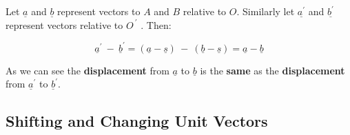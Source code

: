 \begin{note}
\begin{mycenter}
\begin{tikzpicture}[x=0.75pt,y=0.75pt,yscale=-1,xscale=1]
		\end{tikzpicture}
	\end{mycenter}
	Let $\underline{a}$ and $\underline{b}$ represent  vectors  to $A$ and $B$ relative to $O$. Similarly let $\underline{a^{'}}$ and $\underline{b^{'}}$ represent vectors relative to $O^{\ '}$ .  Then:

	$$\underline{a}^{'}  \ - \ \underline{b}^{'}  = (\underline{a} - \underline{s})\  - \ (\underline{b}-\underline{s})  = \underline{a} - \underline{b}$$

	As we can see the {\bf displacement} from $\underline{a}$  to $\underline{b}$ is the {\bf same} as the {\bf displacement} from $\underline{a}^{'}$ to $\underline{b}^{'}$.
\end{note}


\subsection{Shifting and Changing Unit Vectors}

